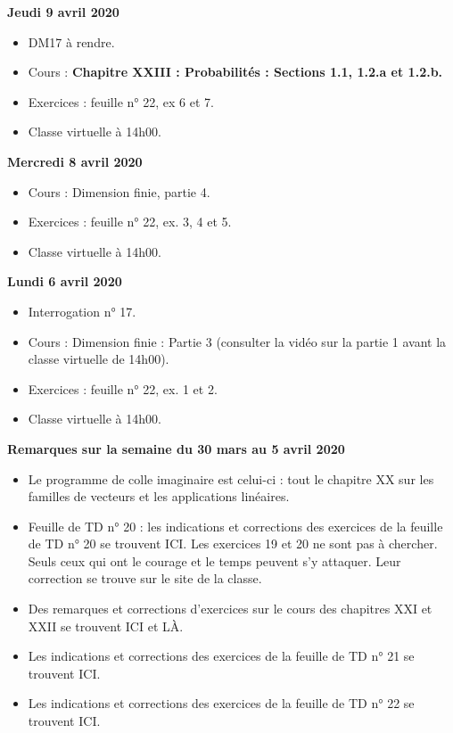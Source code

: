 \documentclass[12pt,a4paper]{article}
\begin{document}
\noindent\textbf{Jeudi 9 avril 2020}
\begin{itemize}
\item DM17 à rendre.
\item Cours : \bf Chapitre XXIII \rm : Probabilités : Sections 1.1, 1.2.a et 1.2.b.
\item Exercices : feuille n° 22, ex 6 et 7.
\item Classe virtuelle à 14h00.\vspace{.4cm}
\end{itemize}

\noindent\textbf{Mercredi 8 avril 2020}
\begin{itemize}
\item Cours : Dimension finie, partie 4.
\item Exercices : feuille n° 22, ex. 3, 4 et 5.
\item Classe virtuelle à 14h00.\vspace{.4cm}
\end{itemize}

\noindent\textbf{\bf Lundi 6 avril 2020}
\begin{itemize}
\item Interrogation n° 17.
\item Cours : Dimension finie : Partie 3 (consulter la vidéo sur la partie 1 avant la classe virtuelle de 14h00).
\item Exercices : feuille n° 22, ex. 1 et 2.
\item Classe virtuelle à 14h00.\vspace{.4cm}
\end{itemize}


\noindent\textbf{\bf Remarques sur la semaine du 30 mars au 5 avril 2020}
\begin{itemize}
\item Le programme de colle imaginaire est celui-ci : tout le chapitre XX sur les familles de vecteurs et les applications linéaires.
\item Feuille de TD n° 20 : les indications et corrections des exercices de la feuille de TD n° 20 se trouvent ICI. Les exercices 19 et 20 ne sont pas à chercher. Seuls ceux qui ont le courage et le temps peuvent s'y attaquer. Leur correction se trouve sur le site de la classe.
\item Des remarques et corrections d'exercices sur le cours des chapitres XXI et XXII se trouvent ICI et LÀ.
\item Les indications et corrections des exercices de la feuille de TD n° 21 se trouvent ICI.
\item Les indications et corrections des exercices de la feuille de TD n° 22 se trouvent ICI.\vspace{.4cm}
\end{itemize}
\end{document}
